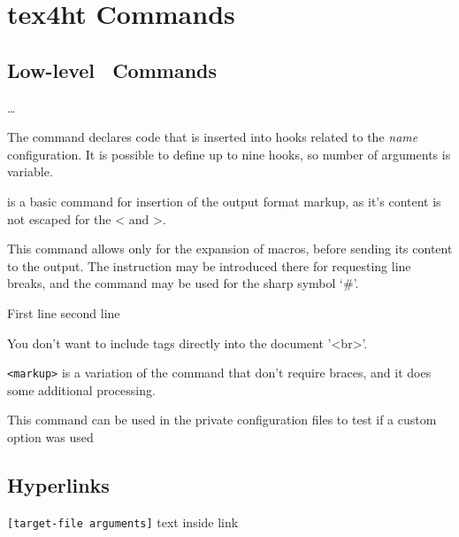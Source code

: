\section{tex4ht Commands}
\label{sec:tex4ht-commands}

\subsection{Low-level \texfourht\ Commands}

\ldots{}

The  command declares code that is inserted into hooks related to the \textit{name} configuration.
It is possible to define up to nine hooks, so number of arguments is variable.




 is a basic command for insertion
of the output format markup, as it's content is not escaped for the \textless{}
and \textgreater.

This command allows only for the expansion of macros, before sending its content to the output. 
The instruction \texcommand{\Hnewline} may be introduced there for requesting line breaks, and the command \texcommand{\#} may be used for the sharp symbol ‘\#’.

\begin{texsource}
First line
second line 

You don't want to include tags directly into the document '<br>'. 
\end{texsource}

\verb|<markup>| is a variation of the  command that don't require braces, and it does some additional processing.


This command can be used in the private configuration files to test if a custom option was used

\subsection{Hyperlinks}

\texttt{[target-file arguments]} text inside link

